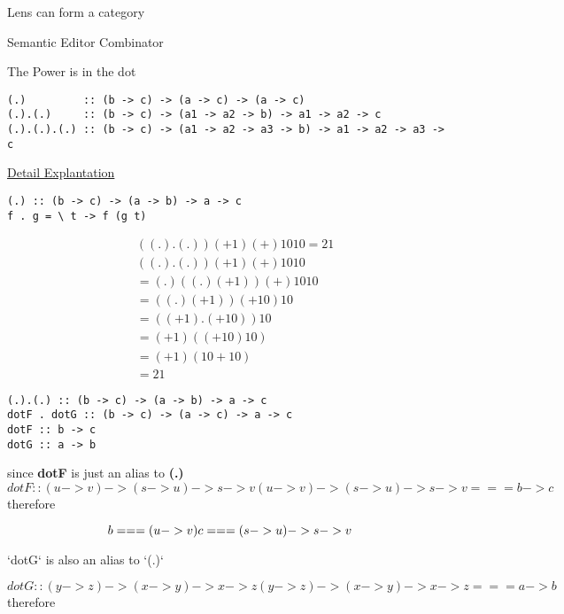 Lens can form a category

 Semantic Editor Combinator

The Power is in the dot
\begin{verbatim}
(.)         :: (b -> c) -> (a -> c) -> (a -> c)
(.).(.)     :: (b -> c) -> (a1 -> a2 -> b) -> a1 -> a2 -> c
(.).(.).(.) :: (b -> c) -> (a1 -> a2 -> a3 -> b) -> a1 -> a2 -> a3 -> c
\end{verbatim}

\href{https://www.reddit.com/r/haskellquestions/comments/ayi445/help_me_understand_the_function_and_its_type}{Detail Explantation}

\begin{verbatim}
(.) :: (b -> c) -> (a -> b) -> a -> c
f . g = \ t -> f (g t)
\end{verbatim}


\begin{align*}
& ((.).(.)) (+1) (+) 10 10 = 21 \\
&  ((.).(.)) (+1) (+) 10 10 \\
& =  (.)((.) (+1)) (+) 10 10 \\
& =  ((.) (+1)) (+ 10) 10   \\
& = ((+1). (+10)) 10 \\
& = (+1) ((+10) 10) \\
& = (+1) (10 + 10) \\
& = 21
\end{align*}

\begin{verbatim}
(.).(.) :: (b -> c) -> (a -> b) -> a -> c
dotF . dotG :: (b -> c) -> (a -> c) -> a -> c
dotF :: b -> c
dotG :: a -> b
\end{verbatim}

since \textbf{dotF} is just an alias to  \textbf{(.)}
\begin{equation}
dotF :: (u -> v) -> (s -> u) -> s -> v
(u -> v) -> (s -> u) -> s -> v === b -> c
\end{equation}
therefore

\begin{equation}
b === (u -> v) \\
c === (s -> u) -> s -> v
\end{equation}

`dotG` is also an alias to `(.)`

\begin{equation}
dotG :: (y -> z) -> (x -> y) -> x -> z
(y -> z) -> (x -> y) -> x -> z === a -> b
\end{equation}
therefore

